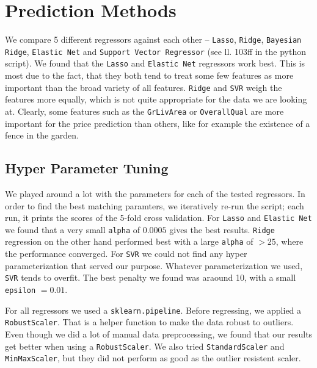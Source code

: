 \section{Prediction Methods}

We compare 5 different regressors against each other -- \texttt{Lasso}, \texttt{Ridge}, \texttt{Bayesian Ridge}, \texttt{Elastic Net} and \texttt{Support Vector Regressor} (see ll. 103ff in the python script). We found that the \texttt{Lasso} and \texttt{Elastic Net} regressors work best. This is most due to the fact, that they both tend to treat some few features as more important than the broad variety of all features. \texttt{Ridge} and \texttt{SVR} weigh the features more equally, which is not quite appropriate for the data we are looking at. Clearly, some features such as the \texttt{GrLivArea} or \texttt{OverallQual} are more important for the price prediction than others, like for example the existence of a fence in the garden.

\subsection{Hyper Parameter Tuning}

We played around a lot with the parameters for each of the tested regressors. In order to find the best matching paramters, we iteratively re-run the script; each run, it prints the scores of the 5-fold cross validation. For \texttt{Lasso} and \texttt{Elastic Net} we found that a very small \texttt{alpha} of $0.0005$ gives the best results. \texttt{Ridge} regression on the other hand performed best with a large \texttt{alpha} of $>25$, where the performance converged. For \texttt{SVR} we could not find any hyper parameterization that served our purpose. Whatever parameterization we used, \texttt{SVR} tends to overfit. The best penalty we found was araound 10, with a small \texttt{epsilon} $= 0.01$.

For all regressors we used a \texttt{sklearn.pipeline}. Before regressing, we applied a \texttt{RobustScaler}. That is a helper function to make the data robust to outliers. Even though we did a lot of manual data preprocessing, we found that our results get better when using a \texttt{RobustScaler}. We also tried \texttt{StandardScaler} and \texttt{MinMaxScaler}, but they did not perform as good as the outlier resistent scaler.

